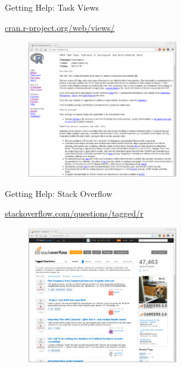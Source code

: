 \documentclass[10pt,ignorenonframetext,compress, aspectratio=169]{beamer}
\begin{document}
\begin{frame}{Getting Help: Task Views}

\url{cran.r-project.org/web/views/}

\begin{figure}
\includegraphics[height=6cm,keepaspectratio=true]{figs/cran-task-views}
\end{figure}

\end{frame}

\begin{frame}{Getting Help: Stack Overflow}

\url{stackoverflow.com/questions/tagged/r}

\begin{figure}
\includegraphics[height=6cm,keepaspectratio=true]{figs/stackoverflow-screen-grab}
\end{figure}

\end{frame}
\end{document}
